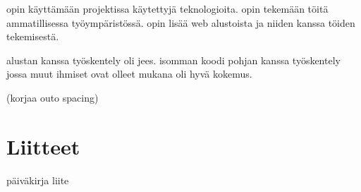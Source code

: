 \documentclass[11pt,a4paper,titlepage,oneside]{article}
\begin{document}
opin käyttämään projektissa käytettyjä teknologioita.
opin tekemään töitä ammatillisessa työympäristössä.
opin lisää web alustoista ja niiden kanssa töiden tekemisestä.
\medskip


alustan kanssa työskentely oli jees.
isomman koodi pohjan kanssa työskentely jossa muut ihmiset ovat olleet mukana oli hyvä kokemus.
\medskip

\fi








\newpage



(korjaa outo spacing)








\section{Liitteet}               %

päiväkirja liite
\end{document}
